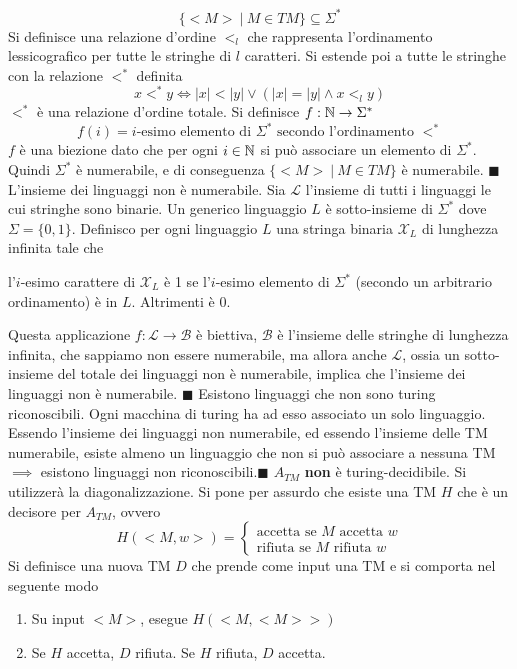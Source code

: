 \documentclass[10pt, letterpaper]{report}
\begin{document}
$$ \{<M>\ |\ M\in TM\}\subseteq \Sigma^*$$
Si definisce una relazione d'ordine $<_l$ che rappresenta l'ordinamento lessicografico per tutte le 
stringhe di $l$ caratteri. Si estende poi  a tutte le stringhe con la relazione $<^*$ definita 
$$ x<^*y\iff 
    |x|<|y| \lor (|x|=|y|\land x<_l y)
$$
$<^*$ è una relazione d'ordine totale. Si definisce $f:{\mathbb N}\rightarrow \Sigma^*$ 
$$ f(i)=i\text{-esimo elemento di $\Sigma^*$ secondo l'ordinamento }<^*$$
$f$ è una biezione dato che per ogni $i\in{\mathbb N}$ si può associare un elemento di $\Sigma^*$. Quindi $\Sigma^*$ è numerabile, e di conseguenza $\{<M>\ |\ M\in TM\}$ è numerabile. \hfill$\blacksquare$\acc 
{} L'insieme dei linguaggi non è numerabile.\acc 
{} Sia $\mathcal{L}$ l'insieme di tutti i linguaggi le cui stringhe sono binarie. Un generico linguaggio $L$ è sotto-insieme di $\Sigma^*$ dove $\Sigma=\{0,1\}$. 
Definisco per ogni linguaggio $L$ una stringa binaria $\mathcal{X}_L$ di lunghezza infinita tale che 
\begin{center}
    l'$i$-esimo carattere di $\mathcal{X}_L$ è 1 se l'$i$-esimo elemento di $\Sigma^*$ (secondo un arbitrario ordinamento) è in $L$. Altrimenti è 0. 
\end{center}
Questa applicazione $f:\mathcal{L}\rightarrow\mathcal{B}$ è biettiva, $\mathcal{B}$ è l'insieme delle stringhe di lunghezza infinita, che sappiamo non essere numerabile, ma allora anche $\mathcal{L}$, ossia un sotto-insieme del totale dei linguaggi non è numerabile, implica che l'insieme dei linguaggi non è numerabile. \hfill$\blacksquare$\acc 
{} Esistono linguaggi che non sono turing riconoscibili. \acc 
\dimo{} Ogni macchina di turing ha ad esso associato un solo linguaggio. Essendo l'insieme dei linguaggi non numerabile, ed essendo l'insieme delle TM numerabile, esiste almeno un linguaggio che non si può associare a nessuna TM $\implies$ esistono linguaggi non riconoscibili.\hfill$\blacksquare$\acc 
\teo{} $A_{TM}$ \textbf{non} è turing-decidibile.\acc 
\dimo{} Si utilizzerà la diagonalizzazione. Si pone per assurdo che esiste una TM $H$ che è un decisore per $A_{TM}$, ovvero 
$$ H(<M,w>)=\begin{cases}
    \text{accetta se $M$ accetta $w$}\\ 
    \text{rifiuta se $M$ rifiuta $w$}
\end{cases}$$
Si definisce una nuova TM $D$ che prende come input una TM e si comporta nel seguente modo \begin{enumerate}
    \item Su input $<M>$, esegue $H(<M,<M>>)$
    \item Se $H$ accetta, $D$ rifiuta. Se $H$ rifiuta, $D$ accetta.
\end{enumerate}
\end{document}
